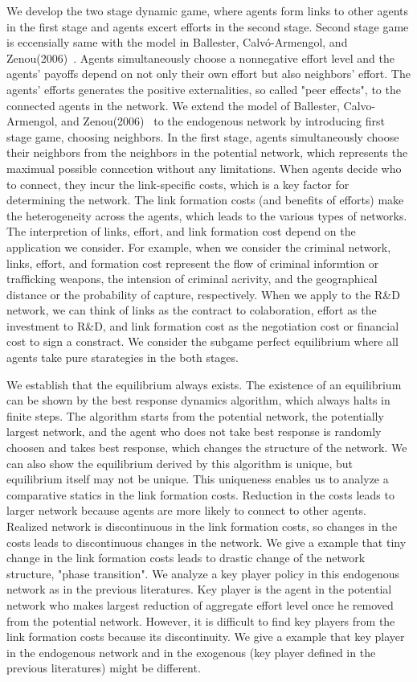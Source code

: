 \documentclass[12pt]{article}
\theoremstyle{definition}
\begin{document}
We develop the two stage dynamic game, where agents form links to other agents in the first stage and agents excert efforts in the second stage.
Second stage game is eccensially same with the model in Ballester, Calv\'{o}-Armengol, and Zenou(2006)~\cite{whowho}.
Agents simultaneously choose a nonnegative effort level and the agents' payoffs depend on not only their own effort but also neighbors' effort.
The agents' efforts generates the positive externalities, so called "peer effects", to the connected agents in the network.
We extend the model of Ballester, Calvo-Armengol, and Zenou(2006)~\cite{whowho} to the endogenous network by introducing first stage game, choosing neighbors.
In the first stage, agents simultaneously choose their neighbors from the neighbors in the potential network, which represents the maximual possible conncetion without any limitations.
When agents decide who to connect, they incur the link-specific costs, which is a key factor for determining the network.
The link formation costs (and benefits of efforts) make the heterogeneity across the agents, which leads to the various types of networks.
The interpretion of links, effort, and link formation cost depend on the application we consider.
For example, when we consider the criminal network, links, effort, and formation cost represent the flow of criminal informtion or trafficking weapons, the intension of criminal acrivity, and the geographical distance or the probability of capture, respectively.
When we apply to the R\&D network, we can think of links as the contract to colaboration, effort as the investment to R\&D, and link formation cost as the negotiation cost or financial cost to sign a constract.
We consider the subgame perfect equilibrium where all agents take pure starategies in the both stages.

We establish that the equilibrium always exists.
The existence of an equilibrium can be shown by the best response dynamics algorithm, which always halts in finite steps.
The algorithm starts from the potential network, the potentially largest network, and the agent who does not take best response is randomly choosen and takes best response, which changes the structure of the network.
We can also show the equilibrium derived by this algorithm is unique, but equilibrium itself may not be unique.
This uniqueness enables us to analyze a comparative statics in the link formation costs.
Reduction in the costs leads to larger network because agents are more likely to connect to other agents.
Realized network is discontinuous in the link formation costs, so changes in the costs leads to discontinuous changes in the network.
We give a example that tiny change in the link formation costs leads to drastic change of the network structure, "phase transition".
We analyze a key player policy in this endogenous network as in the previous literatures.
Key player is the agent in the potential network who makes largest reduction of aggregate effort level once he removed from the potential network.
However, it is difficult to find key players from the link formation costs because its discontinuity.
We give a example that key player in the endogenous network and in the exogenous (key player defined in the previous literatures) might be different.
\end{document}
